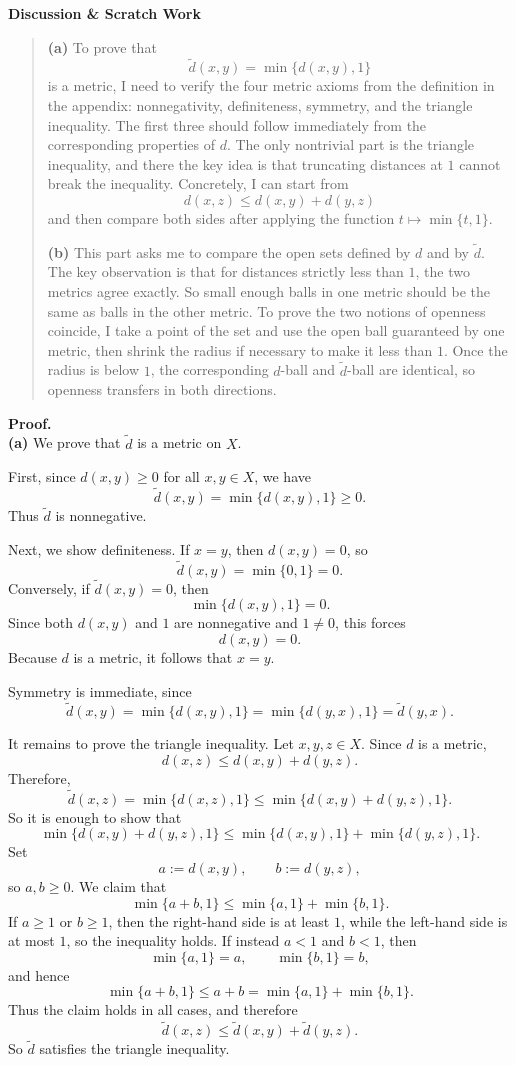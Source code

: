 \documentclass[12pt]{article}
\newenvironment{scratch}{%
  \par\smallskip
  \noindent\textbf{Discussion \& Scratch Work}\begin{quote}\small
}{%
  \end{quote}\smallskip
}
\begin{document}
\begin{scratch}
\textbf{(a)} To prove that
\[
\tilde d(x,y)=\min\{d(x,y),1\}
\]
is a metric, I need to verify the four metric axioms from the definition in the appendix: nonnegativity, definiteness, symmetry, and the triangle inequality. The first three should follow immediately from the corresponding properties of $d$. The only nontrivial part is the triangle inequality, and there the key idea is that truncating distances at $1$ cannot break the inequality. Concretely, I can start from
\[
d(x,z)\le d(x,y)+d(y,z)
\]
and then compare both sides after applying the function $t\mapsto \min\{t,1\}$.

\textbf{(b)} This part asks me to compare the open sets defined by $d$ and by $\tilde d$. The key observation is that for distances strictly less than $1$, the two metrics agree exactly. So small enough balls in one metric should be the same as balls in the other metric. To prove the two notions of openness coincide, I take a point of the set and use the open ball guaranteed by one metric, then shrink the radius if necessary to make it less than $1$. Once the radius is below $1$, the corresponding $d$-ball and $\tilde d$-ball are identical, so openness transfers in both directions.
\end{scratch}

\textbf{Proof.}\\
\textbf{(a)} We prove that $\tilde d$ is a metric on $X$.

First, since $d(x,y)\ge 0$ for all $x,y\in X$, we have
\[
\tilde d(x,y)=\min\{d(x,y),1\}\ge 0.
\]
Thus $\tilde d$ is nonnegative.

Next, we show definiteness. If $x=y$, then $d(x,y)=0$, so
\[
\tilde d(x,y)=\min\{0,1\}=0.
\]
Conversely, if $\tilde d(x,y)=0$, then
\[
\min\{d(x,y),1\}=0.
\]
Since both $d(x,y)$ and $1$ are nonnegative and $1\neq 0$, this forces
\[
d(x,y)=0.
\]
Because $d$ is a metric, it follows that $x=y$.

Symmetry is immediate, since
\[
\tilde d(x,y)=\min\{d(x,y),1\}=\min\{d(y,x),1\}=\tilde d(y,x).
\]

It remains to prove the triangle inequality. Let $x,y,z\in X$. Since $d$ is a metric,
\[
d(x,z)\le d(x,y)+d(y,z).
\]
Therefore,
\[
\tilde d(x,z)=\min\{d(x,z),1\}\le \min\{d(x,y)+d(y,z),1\}.
\]
So it is enough to show that
\[
\min\{d(x,y)+d(y,z),1\}
\le
\min\{d(x,y),1\}+\min\{d(y,z),1\}.
\]
Set
\[
a:=d(x,y),\qquad b:=d(y,z),
\]
so $a,b\ge 0$. We claim that
\[
\min\{a+b,1\}\le \min\{a,1\}+\min\{b,1\}.
\]
If $a\ge 1$ or $b\ge 1$, then the right-hand side is at least $1$, while the left-hand side is at most $1$, so the inequality holds. If instead $a<1$ and $b<1$, then
\[
\min\{a,1\}=a,\qquad \min\{b,1\}=b,
\]
and hence
\[
\min\{a+b,1\}\le a+b=\min\{a,1\}+\min\{b,1\}.
\]
Thus the claim holds in all cases, and therefore
\[
\tilde d(x,z)\le \tilde d(x,y)+\tilde d(y,z).
\]
So $\tilde d$ satisfies the triangle inequality.
\end{document}
